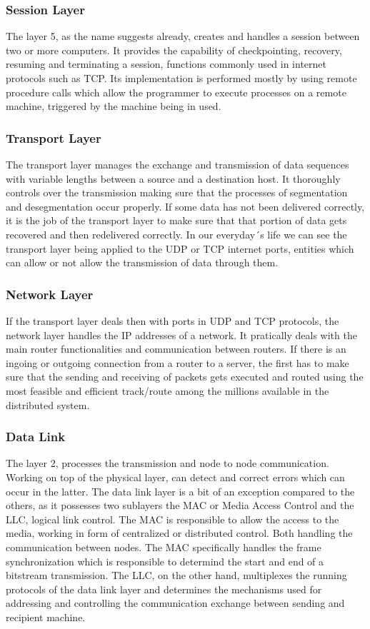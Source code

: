\documentclass[conference]{IEEEtran}
\begin{document}
\subsubsection{Session Layer}
The layer 5, as the name suggests already, creates and handles a session between two or more computers. It provides the capability of checkpointing, recovery, resuming and terminating a session, functions commonly used in internet protocols such as TCP. Its implementation is performed mostly by using remote procedure calls which allow the programmer to execute processes on a remote machine, triggered by the machine being in used.
\subsubsection{Transport Layer}
The transport layer manages the exchange and transmission of data sequences  with variable lengths between a source and a destination host. It thoroughly controls over the transmission making sure that the processes of segmentation and desegmentation occur properly. If some data has not been delivered correctly, it is the job of the transport layer to make sure that that portion of data gets recovered and then redelivered correctly. In our everyday´s life we can see the transport layer being applied to the UDP or TCP internet ports, entities which can allow or not allow the transmission of data through them. 
\subsubsection{Network Layer}
If the transport layer deals then with ports in UDP and TCP protocols, the network layer handles the IP addresses of a network. It pratically deals with the main router functionalities and communication between routers. If there is an ingoing or outgoing connection from a router to a server, the first has to make sure that the sending and receiving of packets gets executed and routed using the most feasible and efficient track/route among the millions available in the distributed system.
\subsubsection{Data Link}
The layer 2, processes the transmission and node to node communication. Working on top of the physical layer, can detect and correct errors which can occur in the latter. The data link layer is a bit of an exception compared to the others, as it possesses two sublayers the MAC or Media Access Control and the LLC, logical link control. 
The MAC is responsible to allow the access to the media, working in form of centralized or distributed control. Both handling the communication between nodes. The MAC specifically handles the frame synchronization which is responsible to determind the start and end of a bitstream transmission. 
The LLC, on the other hand, multiplexes the running protocols of the data link layer and determines the mechanisms used for addressing and controlling the communication exchange between sending and recipient machine.
\end{document}
